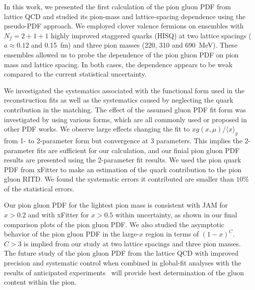 
In this work, we presented the first calculation of the pion gluon PDF from lattice QCD and studied its pion-mass and lattice-spacing dependence using the pseudo-PDF approach.
We employed clover valence fermions on ensembles with $N_f = 2+1+1$ highly improved staggered quarks (HISQ) at two lattice spacings ($a\approx 0.12$ and 0.15~fm) and three pion masses (220, 310 and 690~MeV).
These ensembles allowed us to probe the dependence of the pion gluon PDF on pion mass and lattice spacing.
In both cases, the dependence appears to be weak compared to the current statistical uncertainty.

We investigated the systematics associated with the functional form used in the reconstruction fits as well as the systematics caused by neglecting the quark contribution in the matching.
The effect of the assumed gluon PDF fit form was investigated by using various forms, which are all commonly used or proposed in other PDF works.
We observe large effects changing the fit to $xg(x, \mu)/\langle x \rangle_g$ from 1- to 2-parameter form but convergence at 3 parameters.
This implies the 2-parameter fits are sufficient for our calculation, and our finial pion gluon PDF results are presented using the 2-parameter fit results.
We used the pion quark PDF from xFitter to make an estimation of the quark contribution to the pion gluon RITD.
We found the systematic errors it contributed are smaller than $10\%$ of the statistical errors.

Our pion gluon PDF for the lightest pion mass is consistent with JAM for $x>0.2$ and with xFitter for $x>0.5$ within uncertainty, as shown in our final comparison plots of the pion gluon PDF.
We also studied the asymptotic behavior of the pion gluon PDF in the large-$x$ region in terms of $(1-x)^C$.
$C>3$ is implied from our study at two lattice spacings and three pion masses.
The future study of the pion gluon PDF from the lattice QCD with improved precision and systematic control when combined in global-fit analyses with the results of
anticipated experiments~\cite{Denisov:2018unj,Arrington:2021biu,Anderle:2021wcy,Denisov:2018unj} will provide best determination of the gluon content within the pion.
